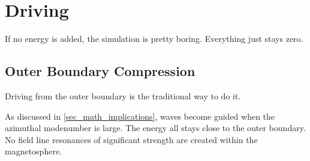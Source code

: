 \section{Driving}
  \label{sec_driving}

If no energy is added, the simulation is pretty boring. Everything just stays zero. 

\subsection{Outer Boundary Compression}

Driving from the outer boundary is the traditional way to do it. 


As discussed in \cref{sec_math_implications}, \Alfven waves become guided when the azimuthal modenumber is large. The energy all stays close to the outer boundary. No field line resonances of significant strength are created within the magnetosphere. 

